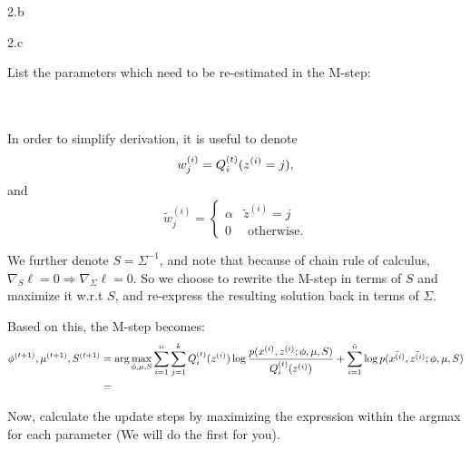 \LARGE
2.b
\normalsize

  \begin{answer}
  \end{answer}
\clearpage

\LARGE
2.c
\normalsize

  \begin{answer}
    List the parameters which need to be re-estimated in the M-step:\\\\\\

    \allowdisplaybreaks

    In order to simplify derivation, it is useful to denote $$w_j^{(i)} = Q^{(t)}_i(z^{(i)}=j),$$ and $$\tilde{w}_j^{(i)} = \begin{cases} \alpha & \tilde{z}^{(i)} = j \\ 0 & \text{ otherwise.} \end{cases}$$

    We further denote $S = \Sigma^{-1}$, and note that because of chain rule of calculus, $\nabla_S\ell = 0 \Rightarrow \nabla_\Sigma \ell = 0$. So we choose to rewrite the M-step in terms of $S$ and maximize it w.r.t $S$, and re-express the resulting solution back in terms of $\Sigma$.

    Based on this, the M-step becomes:
    \begin{align*}
    \phi^{(t+1)}, \mu^{(t+1)}, S^{(t+1)} &=  \arg\max_{\phi,\mu,S} \sum_{i=1}^{n} \sum_{j=1}^k Q_i^{(t)}(z^{(i)}) \log \frac{p(x^{(i)},z^{(i)};\phi,\mu,S)}{Q_i^{(t)}(z^{(i)})} + \sum_{i=1}^{\tilde{{n}}} \log p(\tilde{x^{(i)}}, \tilde{z^{(i)}}; \phi, \mu, S)\\
    &=\\
    \end{align*}

    Now, calculate the update steps by maximizing the expression within the argmax for each parameter (We will do the first for you).


\end{answer}
